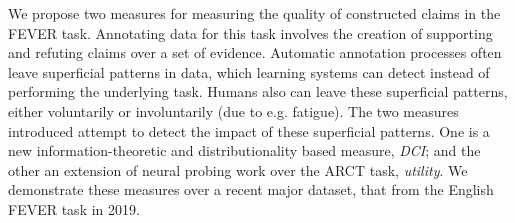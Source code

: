 We propose two measures for measuring the quality of constructed claims in the FEVER task. Annotating data for this task involves the creation of supporting and refuting claims over a set of evidence. Automatic annotation processes often leave superficial patterns in data, which learning systems can detect instead of performing the underlying task. Humans also can leave these superficial patterns, either voluntarily or involuntarily (due to e.g. fatigue). The two measures introduced attempt to detect the impact of these superficial patterns. One is a new information-theoretic and distributionality based measure, \textit{DCI}; and the other an extension of neural probing work over the ARCT task, \textit{utility}. We demonstrate these measures over a recent major dataset, that from the English FEVER task in 2019.
